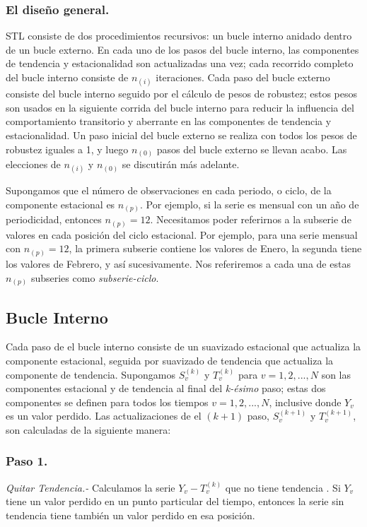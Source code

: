 \documentclass[12pt,oneside]{book}\usepackage[]{graphicx}\usepackage[]{color}
\theoremstyle{definition} %
\begin{document}
\subsubsection{El diseño general.}

STL consiste de dos procedimientos recursivos: un bucle interno anidado dentro de un bucle externo. En cada uno de los pasos del bucle interno, las componentes de tendencia y estacionalidad son actualizadas una vez; cada recorrido completo del bucle interno consiste de $n_{(i)}$ iteraciones. Cada paso del bucle externo consiste del bucle interno seguido por el cálculo de pesos de robustez; estos pesos son usados en la siguiente corrida del bucle interno para reducir la influencia del comportamiento transitorio y aberrante en las componentes de tendencia y  estacionalidad. Un paso inicial del bucle externo se realiza con todos los pesos de robustez iguales a 1, y luego $n_{(0)}$ pasos del bucle externo se llevan acabo. Las elecciones de $n_{(i)}$ y $n_{(0)}$ se discutirán más adelante. 

Supongamos que el número de observaciones en cada periodo, o ciclo, de la componente estacional es $n_{(p)}$. Por ejemplo, si la serie es mensual con un año de periodicidad, entonces $n_{(p)}=12$. Necesitamos poder referirnos a la subserie de valores en cada posición del ciclo estacional. Por ejemplo, para una serie mensual con $n_{(p)}=12$, la primera subserie contiene los valores de Enero, la segunda tiene los valores de Febrero, y así sucesivamente. Nos referiremos a cada una de estas $n_{(p)}$ subseries como \textit{subserie-ciclo}.

\subsection{Bucle Interno}

Cada paso de el bucle interno consiste de un suavizado estacional que actualiza la componente estacional, seguida por suavizado de tendencia que actualiza la componente de tendencia. Supongamos $S_v^{(k)}$ y $T_v^{(k)}$ para $v=1,2,...,N$ son las componentes estacional y de tendencia al final del \textit{k-ésimo} paso; estas dos componentes se definen para todos los tiempos $v=1,2,...,N$, inclusive donde $Y_v$ es un valor perdido. Las actualizaciones de el $(k+1)$ paso, $S_v^{(k+1)}$ y $T_v^{(k+1)}$, son calculadas de la siguiente manera:

\subsubsection{Paso 1.} \textit{Quitar Tendencia.-}
\label{sbsec:paso1}
Calculamos la serie $Y_v-T_v^{(k)}$ que no tiene tendencia . Si $Y_v$ tiene un valor perdido en un punto particular del tiempo, entonces la serie sin tendencia tiene también un valor perdido en esa posición.
\end{document}
